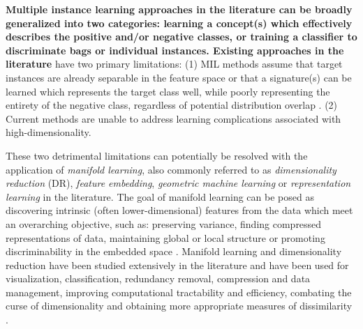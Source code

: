 \textbf{Multiple instance learning approaches in the literature can be broadly generalized into two categories: learning a concept(s) which effectively describes the positive and/or negative classes, or training a classifier to discriminate bags or individual instances.  Existing approaches in the literature} have two primary limitations:  (1) MIL methods assume that target instances are already separable in the feature space or that a signature(s) can be learned which represents the target class well, while poorly representing the entirety of the negative class, regardless of potential distribution overlap \citep{Carbonneau2016MILSurvey}. (2) Current methods are unable to address learning complications associated with high-dimensionality.

These two detrimental limitations can potentially be resolved with the application of \textit{manifold learning}, also commonly referred to as \textit{dimensionality reduction} (DR), \textit{feature embedding}, \textit{geometric machine learning} or \textit{representation learning} in the literature.  The goal of manifold learning can be posed as discovering intrinsic (often lower-dimensional) features from the data which meet an overarching objective, such as: preserving variance, finding compressed representations of data, maintaining global or local structure or promoting discriminability in the embedded space \citep{VanDerMaaten2009DRReview,Bengio2014RepLearningReview, Geng2005SupNonlinearDimRed, Thorstensen2009ManifoldThesis}.  Manifold learning and dimensionality reduction have been studied extensively in the literature and have been used for visualization, classification, redundancy removal, compression and data management, improving computational tractability and efficiency, combating the curse of dimensionality and obtaining more appropriate measures of dissimilarity \citep{Bishop1998GTM,Nickel2017PoincareEmbeddings,Talmon2015ManifoldLearningInDynamicalSystems,Tenenbaum2000Isomap, Geng2005SupNonlinearDimRed, Palomo2017GHNG, Kohonen1990SOM,Kegl2008PrincipalManifoldsTextbook,Bengio2014RepLearningReview}.


